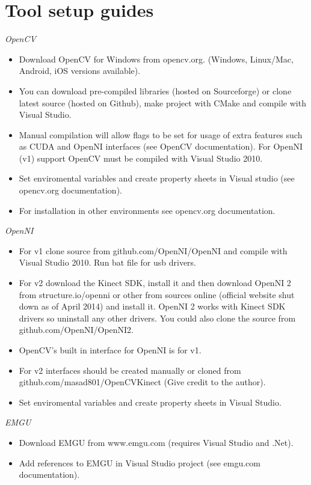 \chapter{Tool setup guides}
\label{chap:tools-setup}

\emph{OpenCV}

\begin{itemize}
\item Download OpenCV for Windows from opencv.org. (Windows, Linux/Mac, Android, iOS versions available).
\item You can download pre-compiled libraries (hosted on Sourceforge) or clone latest source (hosted on Github), make project with CMake and compile with Visual Studio.
\item Manual compilation will allow flags to be set for usage of extra features such as CUDA and OpenNI interfaces (see OpenCV documentation). For OpenNI (v1) support OpenCV must be compiled with Visual Studio 2010.
\item Set enviromental variables and create property sheets in Visual studio (see opencv.org documentation).
\item For installation in other environments see opencv.org documentation.
\end{itemize}

\par
\emph{OpenNI}
\begin{itemize}
\item For v1 clone source from github.com/OpenNI/OpenNI and compile with Visual Studio 2010. Run bat file for usb drivers.
\item For v2 download the Kinect SDK, install it and then download OpenNI 2 from structure.io/openni or other from sources online (official website shut down as of April 2014) and install it. OpenNI 2 works with Kinect SDK drivers so uninstall any other drivers. You could also clone the source from github.com/OpenNI/OpenNI2.
\item OpenCV's built in interface for OpenNI is for v1.
\item For v2 interfaces should be created manually or cloned from github.com/masad801/OpenCVKinect (Give credit to the author).
\item Set enviromental variables and create property sheets in Visual Studio.
\end{itemize}

\par
\emph{EMGU}
\begin{itemize}
\item Download EMGU from www.emgu.com (requires Visual Studio and .Net).
\item Add references to EMGU in Visual Studio project (see emgu.com documentation).
\end{itemize}

